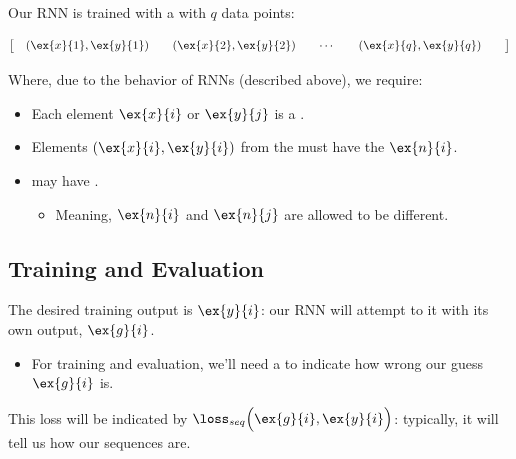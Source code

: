         \begin{definition}
            Our RNN is trained with a  with $q$ data points:

            \begin{equation*}
                \begin{bmatrix}
                    \quad (\ex{x}{1}, \ex{y}{1}) && (\ex{x}{2}, \ex{y}{2}) && \cdots && (\ex{x}{q}, \ex{y}{q}) \quad \quad
                \end{bmatrix}
            \end{equation*}

            Where, due to the behavior of RNNs (described above), we require:

            \begin{itemize}
                \item Each element $\ex{x}{i}$ or $\ex{y}{j}$ is a .
                
                \item Elements $(\ex{x}{i}, \ex{y}{i})$ from the  must have the  $\ex{n}{i}$.

                \item {} may have . 
                    \begin{itemize}
                        \item Meaning, $\ex{n}{i}$ and $\ex{n}{j}$ are allowed to be different.
                    \end{itemize}
            \end{itemize}
        \end{definition}

    \subsection{Training and Evaluation}

        The desired training output is $\ex{y}{i}$: our RNN will attempt to  it with its own output, $\ex{g}{i}$.

        \begin{itemize}
            \item For training and evaluation, we'll need a  to indicate how wrong our guess $\ex{g}{i}$ is.
        \end{itemize}

        This loss will be indicated by $\loss_{seq} \Big(\ex{g}{i}, \ex{y}{i} \Big)$: typically, it will tell us how  our sequences are.

